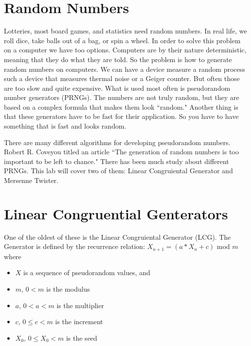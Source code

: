 \label{Ch:PRNG}


\section*{Random Numbers}


Lotteries, most board games, and statistics need random numbers. In real life, we roll dice, take balls out of a bag, or spin a wheel. In order to solve this problem on a computer we have too options. Computers are by their nature deterministic, meaning that they do what they are told. So the problem is how to generate random numbers on computers. We can have a device measure a random process such a device that measures thermal noise or a Geiger counter. But often those are too slow and quite expensive. What is used most often is pseudorandom number generators (PRNGs). The numbers are not truly random, but they are based on a complex formula that makes them look ``random." Another thing is that these generators have to be fast for their application. So you have to have something that is fast and looks random.

There are many different algorithms for developing pseudorandom numbers. Robert R. Coveyou titled an article ``The generation of random numbers is too important to be left to chance." There has been much study about different PRNGs. This lab will cover two of them: Linear Congruiental Generator and Mersenne Twister.

\section*{Linear Congruential Genterators}

One of the oldest of these is the Linear Congruiental Generator (LCG). The Generator is defined by the recurrence relation:
$X_{n+1}=(a*X_n + c)$ mod $m$ where

\begin{itemize}
\item[] $X$ is a sequence of pseudorandom values, and
\item[] $m$, $0<m$ is the modulus
\item[] $a$, $0<a<m$ is the multiplier
\item[] $c$, $0\leq c<m$ is the increment
\item[] $X_0$, $0\leq X_0 <m$ is the seed
\end{itemize}


